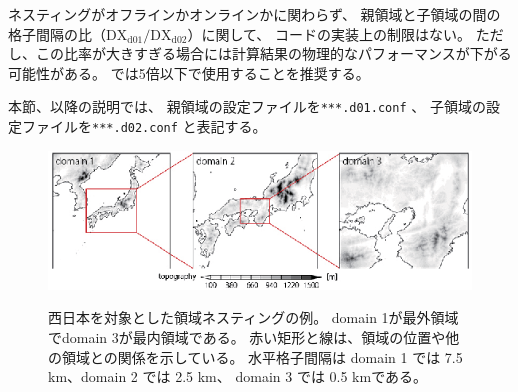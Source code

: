 ネスティングがオフラインかオンラインかに関わらず、
親領域と子領域の間の格子間隔の比（$\mathrm{DX}_{\mathrm{d01}}/\mathrm{DX}_{\mathrm{d02}}$）に関して、
コードの実装上の制限はない。
ただし、この比率が大きすぎる場合には計算結果の物理的なパフォーマンスが下がる可能性がある。
\scalerm では5倍以下で使用することを推奨する。

本節、以降の説明では、
親領域の設定ファイルを\verb|***.d01.conf| 、
子領域の設定ファイルを\verb|***.d02.conf| と表記する。

\begin{figure}[t]
\begin{center}
  \includegraphics[width=1.0\hsize]{./figure/nesting_sample.eps}\\
  \caption{西日本を対象とした領域ネスティングの例。 
    domain 1が最外領域でdomain 3が最内領域である。
    赤い矩形と線は、領域の位置や他の領域との関係を示している。
    水平格子間隔は domain 1 では 7.5 km、domain 2 では 2.5 km、
    domain 3 では 0.5 kmである。}
  \label{fig_nestsample}
\end{center}
\end{figure}


